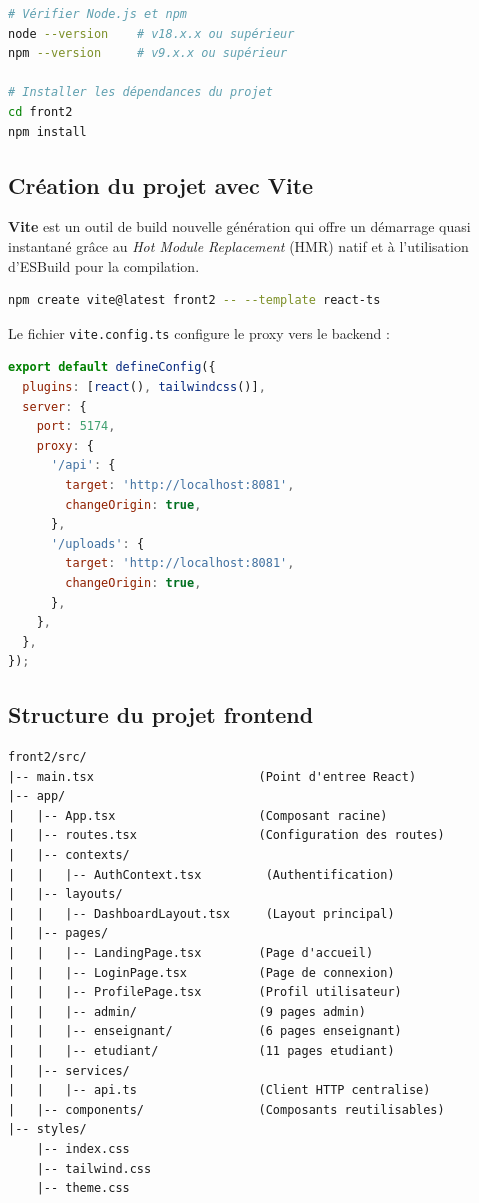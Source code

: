 \begin{lstlisting}[language=bash,caption={Vérification et installation des dépendances frontend}]
# Vérifier Node.js et npm
node --version    # v18.x.x ou supérieur
npm --version     # v9.x.x ou supérieur

# Installer les dépendances du projet
cd front2
npm install
\end{lstlisting}

\subsection{Création du projet avec Vite}

\textbf{Vite} est un outil de build nouvelle génération qui offre un démarrage quasi instantané grâce au \textit{Hot Module Replacement} (HMR) natif et à l'utilisation d'ESBuild pour la compilation.

\begin{lstlisting}[language=bash,caption={Initialisation d'un projet React + TypeScript avec Vite}]
npm create vite@latest front2 -- --template react-ts
\end{lstlisting}

Le fichier \texttt{vite.config.ts} configure le proxy vers le backend :

\begin{lstlisting}[language=JavaScript,caption={Configuration Vite — Proxy vers le backend}]
export default defineConfig({
  plugins: [react(), tailwindcss()],
  server: {
    port: 5174,
    proxy: {
      '/api': {
        target: 'http://localhost:8081',
        changeOrigin: true,
      },
      '/uploads': {
        target: 'http://localhost:8081',
        changeOrigin: true,
      },
    },
  },
});
\end{lstlisting}

\subsection{Structure du projet frontend}

\begin{lstlisting}[caption={Arborescence du frontend (front2/)},basicstyle=\small\ttfamily]
front2/src/
|-- main.tsx                       (Point d'entree React)
|-- app/
|   |-- App.tsx                    (Composant racine)
|   |-- routes.tsx                 (Configuration des routes)
|   |-- contexts/
|   |   |-- AuthContext.tsx         (Authentification)
|   |-- layouts/
|   |   |-- DashboardLayout.tsx     (Layout principal)
|   |-- pages/
|   |   |-- LandingPage.tsx        (Page d'accueil)
|   |   |-- LoginPage.tsx          (Page de connexion)
|   |   |-- ProfilePage.tsx        (Profil utilisateur)
|   |   |-- admin/                 (9 pages admin)
|   |   |-- enseignant/            (6 pages enseignant)
|   |   |-- etudiant/              (11 pages etudiant)
|   |-- services/
|   |   |-- api.ts                 (Client HTTP centralise)
|   |-- components/                (Composants reutilisables)
|-- styles/
    |-- index.css
    |-- tailwind.css
    |-- theme.css
\end{lstlisting}

